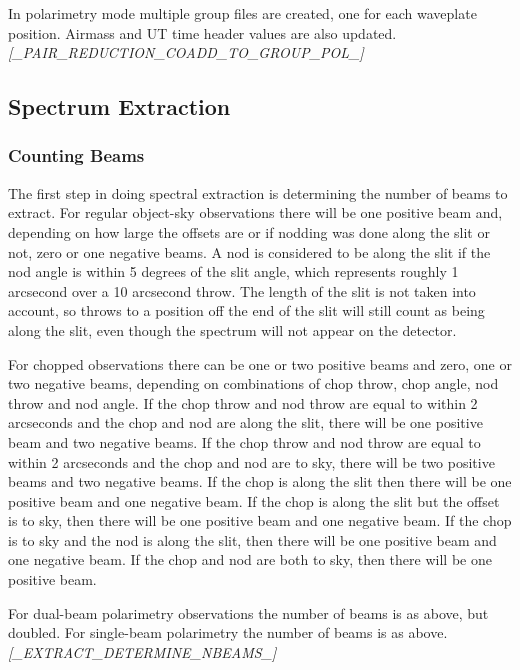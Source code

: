 \documentclass[twoside,11pt,nolof]{starlink}
\begin{document}
In polarimetry mode multiple group files are created, one for
each waveplate position. Airmass and UT time header values
are also updated.
\newline \emph{[\_PAIR\_REDUCTION\_COADD\_TO\_GROUP\_POL\_]}

\subsection{Spectrum Extraction\label{spectrum_extraction}}

\subsubsection{Counting Beams\label{counting_beams}}

The first step in doing spectral extraction is determining the number
of beams to extract. For regular object-sky observations there will
be one positive beam and, depending on how large the offsets are or if
nodding was done along the slit or not, zero or one negative beams. A nod
is considered to be along the slit if the nod angle is within 5 degrees of
the slit angle, which represents roughly 1 arcsecond over a 10 arcsecond
throw. The length of the slit is not taken into account, so throws to
a position off the end of the slit will still count as being along the
slit, even though the spectrum will not appear on the detector.

For chopped observations there can be one or two positive beams and
zero, one or two negative beams, depending on combinations of chop
throw, chop angle, nod throw and nod angle. If the chop throw and nod
throw are equal to within 2 arcseconds and the chop and nod are along the slit,
there will be one positive beam and two negative beams. If the chop
throw and nod throw are equal to within 2 arcseconds and the chop and nod are
to sky, there will be two positive beams and two negative beams. If
the chop is along the slit then there will be one positive beam and
one negative beam. If the chop is along the slit but the offset is
to sky, then there will be one positive beam and one negative beam.
If the chop is to sky and the nod is along the slit, then there
will be one positive beam and one negative beam. If the chop and nod
are both to sky, then there will be one positive beam.

For dual-beam polarimetry observations the number of beams is as above, but
doubled. For single-beam polarimetry the number of beams is as above.
\newline \emph{[\_EXTRACT\_DETERMINE\_NBEAMS\_]}
\end{document}
